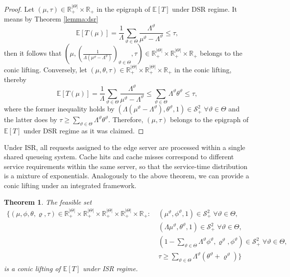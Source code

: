 \documentclass[a4paper,11pt,reqno]{amsart}
\newtheorem{theorem}{Theorem}
\newcommand{\R}{\mathbb{R}}
\newcommand{\E}{\mathbb{E}}
\renewcommand{\SS}{\mathcal{S}}
\begin{document}
\begin{proof}
    Let $(\mu,\tau)\in \R^{|\Theta|}_+\times \R_+$ in the epigraph of $\E[T]$ under DSR regime. It means by Theorem \ref{lemma:dsr}
    \begin{equation*}
        \E[T(\mu)]= \frac{1}{\Lambda} \sum_{\vartheta\in\Theta} \frac{\Lambda^\vartheta}{\mu^\vartheta-\Lambda^\vartheta}\leq \tau,
    \end{equation*}
    then it follows that $\left(\mu, \left(\frac{1}{\Lambda(\mu^\vartheta-\Lambda^\vartheta)}\right)_{\vartheta\in\Theta},\tau\right)\in \R^{|\Theta|}_+\times\R^{|\Theta|}_+\times \R_+$ belongs to the conic lifting. Conversely, let $(\mu,\theta,\tau)\in \R^{|\Theta|}_+\times\R^{|\Theta|}_+\times \R_+$ in the conic lifting, thereby
    \begin{equation*}
        \E[T(\mu)]= \frac{1}{\Lambda} \sum_{\vartheta\in\Theta} \frac{\Lambda^\vartheta}{\mu^\vartheta-\Lambda^\vartheta} \leq \sum_{\vartheta\in\Theta} \Lambda^\vartheta\theta^\vartheta \leq \tau,
    \end{equation*}
    where the former inequality holds by $(\Lambda(\mu^\vartheta-\Lambda^\vartheta), \theta^\vartheta,1)\in \SS^2_+\;  \forall \vartheta\in\Theta$ and the latter does by $\tau\geq \sum_{\vartheta\in\Theta} \Lambda^\vartheta\theta^\vartheta$. Therefore, $(\mu,\tau)$ belongs to the epigraph of $\E[T]$ under DSR regime as it was claimed.
\end{proof}

Under ISR, all requests assigned to the edge server are processed within a single shared queueing system. Cache hits and cache misses correspond to different service requirements within the same server, so that the service-time distribution is a mixture of exponentials. Analogously to the above theorem, we can provide a conic lifting under an integrated framework.

\begin{theorem}\label{th:expectation_isr}
    The feasible set 
    \begin{align*}
    \bigg\{(\mu,\phi,\theta,\varrho,\tau)\in \R^{|\Theta|}_+\times\R^{|\Theta|}_+\times \R^{|\Theta|}_+\times \R^{|\Theta|}_+\times \R_+ : \; &  (\mu^\vartheta, \phi^\vartheta,1)\in \SS^2_+\;  \forall \vartheta\in\Theta, \\
    & \left(\Lambda\mu^\vartheta, \theta^\vartheta,1\right)\in \SS^2_+\;  \forall \vartheta\in\Theta, \\
    & \left(1-\sum_{\vartheta\in\Theta} \Lambda^\vartheta\phi^\vartheta, \varrho^\vartheta, \phi^\vartheta\right)\in \SS^2_+\; \forall \vartheta\in\Theta,\\
    & \tau \geq \sum_{\vartheta\in\Theta} \Lambda^\vartheta(\theta^\vartheta+\varrho^\vartheta) \Bigg\}
    \end{align*}
    is a conic lifting of $\E[T]$ under {\rm ISR} regime.
\end{theorem}
\end{document}
